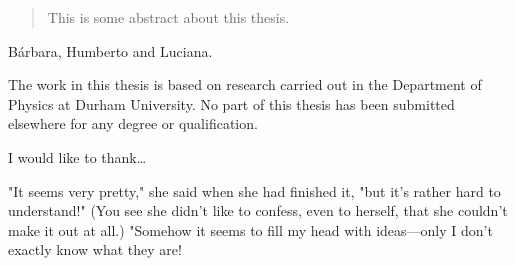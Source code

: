 \documentclass[twoside,openright,frontopenright]{ip3thesis}
\begin{document}
\title{}
\subtitle{}
\author{Matheus Hostert}
\maketitlepage*

\begin{abstract}
%
	This is some abstract about this thesis.
%
\end{abstract}


\begin{dedication*}
%
B\'arbara, Humberto and Luciana.
%
\end{dedication*}

\disableprotrusion
\tableofcontents*
\listoffigures
\listoftables
\enableprotrusion

\begin{declaration*}
%
	The work in this thesis is based on research carried out in the Department of
	Physics at Durham University. No part of this thesis has been
	submitted elsewhere for any degree or qualification.
%
\end{declaration*}

\begin{acknowledgements*}
%
	I would like to thank\ldots
%
\end{acknowledgements*}



\cleardoublepage

\begin{epigraph*}
%
	"It seems very pretty," she said when she had finished it, "but it's rather hard to understand!" (You see she didn't like to confess, even to herself, that she couldn't make it out at all.) "Somehow it seems to fill my head with ideas—only I don't exactly know what they are!
%
\end{epigraph*}
\end{document}
